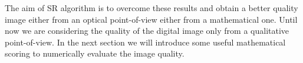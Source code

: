 \documentclass{standalone}
\begin{document}
The aim of SR algorithm is to overcome these results and obtain a better quality image either from an optical point-of-view either from a mathematical one.
Until now we are considering the quality of the digital image only from a qualitative point-of-view.
In the next section we will introduce some useful mathematical scoring to numerically evaluate the image quality.
\end{document}
